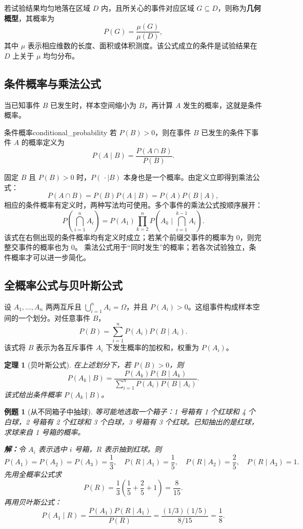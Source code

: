 \documentclass[11pt,a4paper,fontset=fandol]{ctexart}
\newtheorem{theorem}{定理}[section]
\newtheorem{example}{例题}[section]
\theoremstyle{remark}
\begin{document}
若试验结果均匀地落在区域 $D$ 内，且所关心的事件对应区域 $G\subseteq D$，则称为\textbf{几何概型}，其概率为
\[
    P(G)=\frac{\mu(G)}{\mu(D)},
\]
其中 $\mu$ 表示相应维数的长度、面积或体积测度。该公式成立的条件是试验结果在 $D$ 上关于 $\mu$ 均匀分布。

\subsection{条件概率与乘法公式}
当已知事件 $B$ 已发生时，样本空间缩小为 $B$，再计算 $A$ 发生的概率，这就是条件概率。

\begin{definition}{条件概率}{conditional_probability}
若 $P(B)>0$，则在事件 $B$ 已发生的条件下事件 $A$ 的概率定义为
\[
    P(A\mid B)=\frac{P(A\cap B)}{P(B)}.
\]
\end{definition}

固定 $B$ 且 $P(B)>0$ 时，$P(\,\cdot\mid B)$ 本身也是一个概率。由定义立即得到乘法公式：
\[
    P(A\cap B)=P(B)P(A\mid B)=P(A)P(B\mid A),
\]
相应的条件概率有定义时，两种写法均可使用。多个事件的乘法公式按顺序展开：
\[
    P\left(\bigcap_{i=1}^{n}A_i\right)
    =P(A_1)\prod_{k=2}^{n}
    P\left(A_k\mid\bigcap_{i=1}^{k-1}A_i\right).
\]
该式在右侧出现的条件概率均有定义时成立；若某个前缀交事件的概率为 $0$，则完整交事件的概率也为 $0$。
乘法公式用于“同时发生”的概率；若各次试验独立，条件概率才可以进一步简化。

\subsection{全概率公式与贝叶斯公式}
设 $A_1,\ldots,A_n$ 两两互斥且 $\bigcup_{i=1}^n A_i=\Omega$，并且 $P(A_i)>0$。这组事件构成样本空间的一个划分。对任意事件 $B$，
\[
    P(B)=\sum_{i=1}^{n}P(A_i)P(B\mid A_i).
\]
该式将 $B$ 表示为各互斥事件 $A_i$ 下发生概率的加权和，权重为 $P(A_i)$。

\begin{theorem}[贝叶斯公式]
在上述划分下，若 $P(B)>0$，则
\[
    P(A_k\mid B)
    =\frac{P(A_k)P(B\mid A_k)}
    {\displaystyle\sum_{i=1}^{n}P(A_i)P(B\mid A_i)}.
\]
该式给出条件概率 $P(A_k\mid B)$。
\end{theorem}

\begin{example}[从不同箱子中抽球]
等可能地选取一个箱子：1 号箱有 1 个红球和 4 个白球，2 号箱有 2 个红球和 3 个白球，3 号箱有 3 个红球。已知抽出的是红球，求球来自 1 号箱的概率。

\textbf{解：}令 $A_i$ 表示选中 $i$ 号箱，$R$ 表示抽到红球。则
\[
    P(A_1)=P(A_2)=P(A_3)=\frac{1}{3},\quad
    P(R\mid A_1)=\frac{1}{5},\quad
    P(R\mid A_2)=\frac{2}{5},\quad
    P(R\mid A_3)=1.
\]
先用全概率公式求
\[
    P(R)=\frac{1}{3}\left(\frac{1}{5}+\frac{2}{5}+1\right)=\frac{8}{15}.
\]
再用贝叶斯公式：
\[
    P(A_1\mid R)
    =\frac{P(A_1)P(R\mid A_1)}{P(R)}
    =\frac{(1/3)(1/5)}{8/15}
    =\frac{1}{8}.
\]
\end{example}
\end{document}
